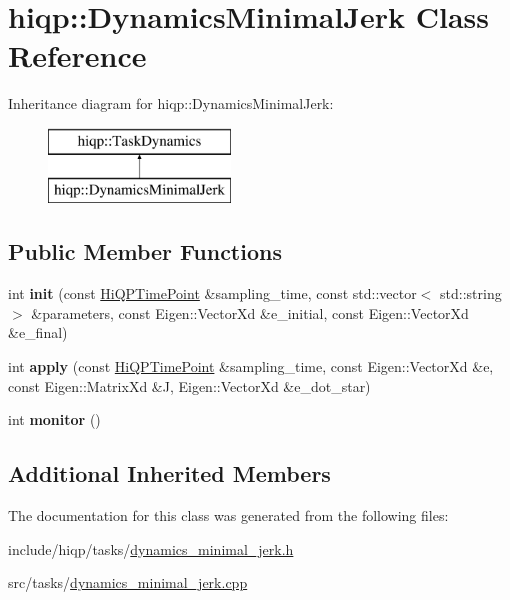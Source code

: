 \hypertarget{classhiqp_1_1DynamicsMinimalJerk}{\section{hiqp\-:\-:Dynamics\-Minimal\-Jerk Class Reference}
\label{classhiqp_1_1DynamicsMinimalJerk}
}
Inheritance diagram for hiqp\-:\-:Dynamics\-Minimal\-Jerk\-:\begin{figure}[H]
\begin{center}
\leavevmode
\includegraphics[height=2.000000cm]{classhiqp_1_1DynamicsMinimalJerk}
\end{center}
\end{figure}
\subsection*{Public Member Functions}
\begin{DoxyCompactItemize}
\item 
\hypertarget{classhiqp_1_1DynamicsMinimalJerk_a8e29102ccfbaed3cdfcc965d3e1fcd7a}{int {\bfseries init} (const \hyperlink{classhiqp_1_1HiQPTimePoint}{Hi\-Q\-P\-Time\-Point} \&sampling\-\_\-time, const std\-::vector$<$ std\-::string $>$ \&parameters, const Eigen\-::\-Vector\-Xd \&e\-\_\-initial, const Eigen\-::\-Vector\-Xd \&e\-\_\-final)}\label{classhiqp_1_1DynamicsMinimalJerk_a8e29102ccfbaed3cdfcc965d3e1fcd7a}

\item 
\hypertarget{classhiqp_1_1DynamicsMinimalJerk_a275c96acdb50b0ff70a026352868b616}{int {\bfseries apply} (const \hyperlink{classhiqp_1_1HiQPTimePoint}{Hi\-Q\-P\-Time\-Point} \&sampling\-\_\-time, const Eigen\-::\-Vector\-Xd \&e, const Eigen\-::\-Matrix\-Xd \&J, Eigen\-::\-Vector\-Xd \&e\-\_\-dot\-\_\-star)}\label{classhiqp_1_1DynamicsMinimalJerk_a275c96acdb50b0ff70a026352868b616}

\item 
\hypertarget{classhiqp_1_1DynamicsMinimalJerk_a05e1d6c10f9f7f896f653b287f8192b1}{int {\bfseries monitor} ()}\label{classhiqp_1_1DynamicsMinimalJerk_a05e1d6c10f9f7f896f653b287f8192b1}

\end{DoxyCompactItemize}
\subsection*{Additional Inherited Members}


The documentation for this class was generated from the following files\-:\begin{DoxyCompactItemize}
\item 
include/hiqp/tasks/\hyperlink{dynamics__minimal__jerk_8h}{dynamics\-\_\-minimal\-\_\-jerk.\-h}\item 
src/tasks/\hyperlink{dynamics__minimal__jerk_8cpp}{dynamics\-\_\-minimal\-\_\-jerk.\-cpp}\end{DoxyCompactItemize}
